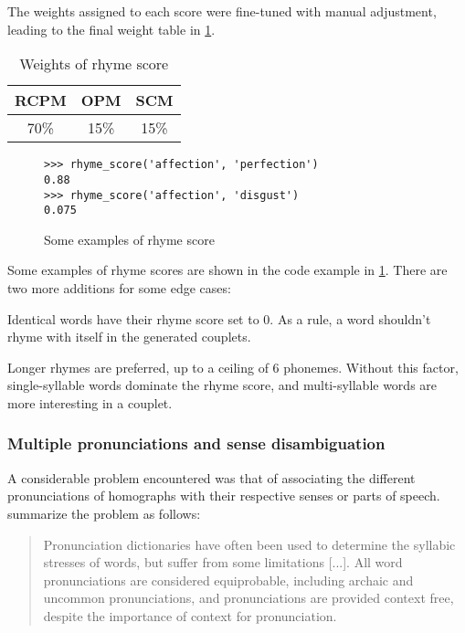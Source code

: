 \documentclass[11pt,a4paper]{article}
\newenvironment{tight_enumerate}{
\begin{enumerate}
\setlength{\itemsep}{0pt}
\setlength{\parskip}{0pt}
}{\end{enumerate}}
\begin{document}
The weights assigned to each score were fine-tuned with manual adjustment, leading to the final weight table in \ref{table:weight_rhyme_score}.

\begin{table}[ht]
\centering
\begin{tabular}{c c c}
	\hline\hline
	RCPM & OPM & SCM \\ [0.5ex]
	\hline
	70\% & 15\% & 15\% \\ [0.5ex]
	\hline
\end{tabular}
\caption{Weights of rhyme score}
\label{table:weight_rhyme_score}
\end{table}

\begin{figure}
\begin{Verbatim}[fontsize=\small]
>>> rhyme_score('affection', 'perfection')
0.88
>>> rhyme_score('affection', 'disgust')
0.075
\end{Verbatim}
\caption{Some examples of rhyme score}
\label{fig:rhymescorecode}
\end{figure}

Some examples of rhyme scores are shown in the code example in \ref{fig:rhymescorecode}. There are two more additions for some edge cases:

\begin{tight_enumerate}
	\vspace{-0.5em}
	\item
		Identical words have their rhyme score set to 0. As a rule, a word shouldn't rhyme with itself in the generated couplets.
	\item
		Longer rhymes are preferred, up to a ceiling of 6 phonemes. Without this factor, single-syllable words dominate the rhyme score, and multi-syllable words are more interesting in a couplet.
\end{tight_enumerate}

\subsubsection{Multiple pronunciations and sense disambiguation}

A considerable problem encountered was that of associating the different pronunciations of homographs with their respective senses or parts of speech. \citet{hopkins-kiela-2017} summarize the problem as follows:

\begin{quote}
Pronunciation dictionaries have often been used to determine the syllabic stresses of words, but suffer from some limitations [...]. All word pronunciations are considered equiprobable, including archaic and uncommon pronunciations, and pronunciations are provided context free, despite the importance of context for pronunciation.
\end{quote}
\end{document}
